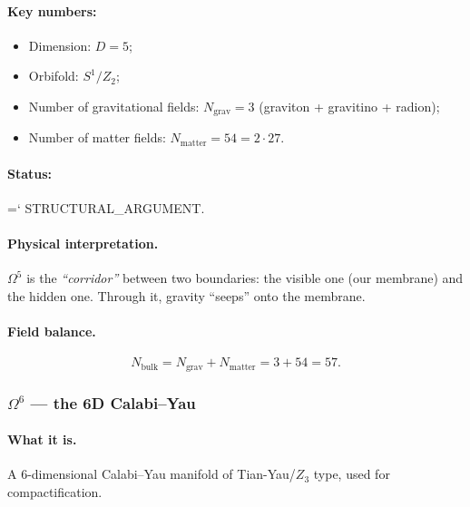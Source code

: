 \documentclass[11pt,a4paper]{article}
\newcommand{\Omf}{\Omega^5}
\newcommand{\Oms}{\Omega^6}
\newcommand{\Nbulk}{N_{\text{bulk}}}
\renewcommand{\texttt}[1]{{\ttfamily\hyphenchar\font=`\- #1}}
\theoremstyle{definition}
\begin{document}
\paragraph{Key numbers:}
\begin{itemize}
    \item Dimension: $D = 5$;
    \item Orbifold: $S^1/Z_2$;
    \item Number of gravitational fields: $N_{\text{grav}} = 3$ 
          (graviton + gravitino + radion);
    \item Number of matter fields: $N_{\text{matter}} = 54 = 2 \cdot 27$.
\end{itemize}

\paragraph{Status:} \texttt{STRUCTURAL\_ARGUMENT}.

\paragraph{Physical interpretation.}
$\Omf$ is the \emph{``corridor''} between two boundaries: the visible 
one (our membrane) and the hidden one. Through it, gravity ``seeps'' 
onto the membrane.

\paragraph{Field balance.}
\begin{equation}
    \Nbulk = N_{\text{grav}} + N_{\text{matter}} 
    = 3 + 54 = 57.
\end{equation}

\subsubsection{$\Oms$ — the 6D Calabi--Yau}

\paragraph{What it is.}
A 6-dimensional Calabi--Yau manifold of Tian-Yau/$Z_3$ type, 
used for compactification.
\end{document}

